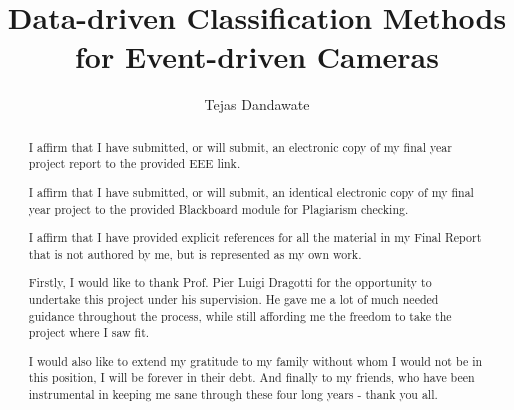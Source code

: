 \documentclass[a4paper, twoside, 11pt]{report}
\title{Data-driven Classification Methods for Event-driven Cameras}
\author{Tejas Dandawate}
\begin{document}


\renewcommand{\abstractname}{Final Report Plagiarism Statement}
\begin{abstract}
    I affirm that I have submitted, or will submit, an electronic copy of my final year project report to the provided EEE link.

    I affirm that I have submitted, or will submit, an identical electronic copy of my final year project to the provided Blackboard module for Plagiarism checking.

    I affirm that I have provided explicit references for all the material in my Final Report that is not authored by me, but is represented as my own work.
\end{abstract}

\renewcommand{\abstractname}{Acknowledgements}
\begin{abstract}
    Firstly, I would like to thank Prof. Pier Luigi Dragotti for the opportunity to undertake this project under his supervision. He gave me a lot of much needed guidance throughout the process, while still affording me the freedom to take the project where I saw fit.

    I would also like to extend my gratitude to my family without whom I would not be in this position, I will be forever in their debt. And finally to my friends, who have been instrumental in keeping me sane through these four long years - thank you all.
\end{abstract}
\end{document}
